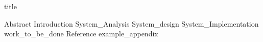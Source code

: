 \documentclass{article}
\begin{document}
{title}

\tableofcontents



\mainmatter

{Abstract}
\newpage
{Introduction}
\newpage
{System_Analysis}
\newpage
{System_design}
\newpage
{System_Implementation}
\newpage
{work_to_be_done}
\newpage
{Reference}
\addappendix
{example_appendix}
\end{document}
